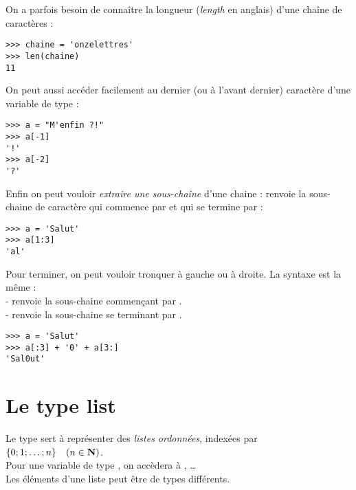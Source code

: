 On a parfois besoin de connaître la longueur (\emph{length} en anglais) d'une chaîne de caractères :

\begin{pys}\begin{verbatim}
>>> chaine = 'onzelettres'
>>> len(chaine)
11
\end{verbatim}
\end{pys}

On peut aussi accéder facilement au dernier (ou à l'avant dernier) caractère d'une variable de type  :

\begin{pys}\begin{verbatim}
>>> a = "M'enfin ?!"
>>> a[-1]
'!'
>>> a[-2]
'?'
\end{verbatim}
\end{pys}

Enfin on peut vouloir \textit{extraire une sous-chaîne} d'une chaine :  renvoie la sous-chaine de caractère qui commence par
 et qui se termine par  :

\begin{pys}\begin{verbatim}
>>> a = 'Salut'
>>> a[1:3]
'al'
\end{verbatim}
\end{pys}

Pour terminer, on peut vouloir tronquer à gauche ou à droite. La syntaxe est la même :\\
-  renvoie la sous-chaine commençant par .\\
-   renvoie la sous-chaine se terminant par .

\begin{pys}\begin{verbatim}
>>> a = 'Salut'
>>> a[:3] + '0' + a[3:]
'Sal0ut'
\end{verbatim}
\end{pys}

\section{Le type list}

Le type  sert à représenter des \textit{listes ordonnées}, indexées par $\lbrace 0;1;\ldots ;n\rbrace\quad (n\in\mathbf{N})$.\\
Pour une variable  de type , on accèdera à , \ldots\\
Les éléments d'une liste peut être de types différents.

